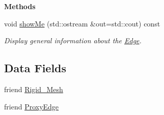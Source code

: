 \begin{Indent}{\bf Methods}\par
\begin{DoxyCompactItemize}
\item 
void \hyperlink{classFVCode3D_1_1Rigid__Mesh_1_1Edge_aedaf9a2d04ce829ee8bea9cf7eb0b6dd}{show\+Me} (std\+::ostream \&out=std\+::cout) const 
\begin{DoxyCompactList}\small\item\em Display general information about the \hyperlink{classFVCode3D_1_1Rigid__Mesh_1_1Edge}{Edge}. \end{DoxyCompactList}\end{DoxyCompactItemize}
\end{Indent}
\subsection*{Data Fields}
\begin{DoxyCompactItemize}
\item 
friend \hyperlink{classFVCode3D_1_1Rigid__Mesh_1_1Edge_a921de775da515749f902ff8cdc682f30}{Rigid\+\_\+\+Mesh}
\item 
friend \hyperlink{classFVCode3D_1_1Rigid__Mesh_1_1Edge_a67d5b2a6f94834a5255f92e31552dd76}{Proxy\+Edge}
\end{DoxyCompactItemize}
